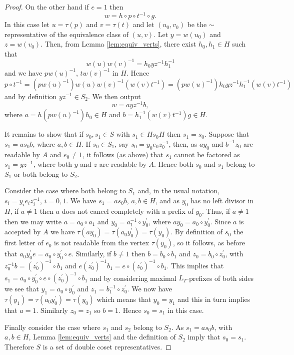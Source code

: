 \documentclass[a4paper,12pt]{article}
\renewcommand{\t}{\tau }
\numberwithin{equation}{section}
\numberwithin{figure}{section}
\begin{document}
\begin{proof}
On the other hand if $e=1$ then 
\[w=h\circ p\circ t^{-1}\circ g.\]
In this case let $u=\t(p)$ and $v=\t(t)$ and let $(u_0,v_0)$ be the $\sim$ representative
of the equivalence class of $(u,v)$.  Let $y=w(u_0)$ and $z=w(v_0)$. Then,  from Lemma
\ref{lem:equiv_verts}, there exist $h_0,h_1\in H$ such that 
\[w(u)w(v)^{-1}=h_0yz^{-1}h_1^{-1}\]
and we have $p w(u)^{-1}$, $t w(v)^{-1}$ in $H$. Hence 
\[
p\circ t^{-1}=( p w(u)^{-1})w(u)w(v)^{-1}( w(v)t^{-1})=( p w(u)^{-1}) h_0 yz^{-1}
h_1^{-1}( w(v)t^{-1})
\]
and by definition $yz^{-1}\in S_2$. We then output 
\[w=a yz^{-1} b,\]
where $a=h ( p w(u)^{-1}) h_0\in H$ and $b=h_1^{-1}( w(v)t^{-1})g \in H$.

It remains to show that if $s_0,s_1\in S$ with $s_1\in Hs_0H$ then $s_1=s_0$.
Suppose that $s_1=as_0b$, where $a, b\in H$.  
If $s_0\in S_1$, say $s_0=y_0e_0z_0^{-1}$, then, as $ay_0$ and $b^{-1}z_0$ are readable
by $A$ and $e_0\neq 1$, it follows (as above) that $s_1$  
cannot be factored as $s_1=yz^{-1}$,
where both $y$ and $z$ are readable by $A$. Hence both $s_0$ and $s_1$ belong to
$S_1$ or both belong to $S_2$. 

Consider the case where both belong to $S_1$ and, in the usual notation,
$s_i=y_i e_i z_i^{-1}$, $i=0,1$. We have $s_1=as_0b$, $a,b\in H$, and as $y_0$ has
no left divisor in $H$, if $a\neq 1$ then $a$ does not cancel completely with
 a prefix of $y_0$. Thus, if $a\neq 1$ then we may write $a=a_0\circ a_1$ and 
$y_0=a_1^{-1}\circ y_0^\prime$, where $ay_0=a_0\circ y_0^\prime$. Since 
$a$ is accepted by $A$ we have $\t(ay_0)=\t(a_0y_0^\prime)=\t(y_0)$. By definition
of $s_0$ the first letter of $e_0$ is not readable from the vertex $\t(y_0)$, so
it follows, as before that $a_0y_0^\prime e=a_0\circ y_0^\prime \circ e$. Similarly,
if $b\neq 1$ then $b=b_0\circ b_1$ and $z_0=b_0\circ z_0^\prime$, with
$z_0^{-1}b= (z_0^\prime)^{-1}\circ b_1$ and $e (z_0^\prime)^{-1}b_1=
e\circ  (z_0^\prime)^{-1}\circ b_1$. This implies that 
$s_1=a_0\circ y_0^\prime \circ  e\circ  (z_0^\prime)^{-1}\circ b_1$ and by considering 
maximal $L_T$-prefixes of both sides we see that $y_1=a_0\circ y_0^\prime$ and 
$z_1=b_1^{-1}\circ z_0^\prime$. We now have  $\t(y_1)=\t(a_0y_0^\prime)=\t(y_0)$ which
 means that 
$y_0=y_1$ and this in turn implies that $a=1$. Similarly $z_0=z_1$ so $b=1$. 
Hence $s_0=s_1$ in this case.

Finally consider the case where $s_1$ and $s_2$ belong to $S_2$. As $s_1=as_0b$, with
$a,b\in H$, Lemma \ref{lem:equiv_verts} and the definition of $S_2$ imply  that 
$s_0= s_1$. Therefore $S$ is a set of double coset representatives.
\end{proof}
\end{document}
